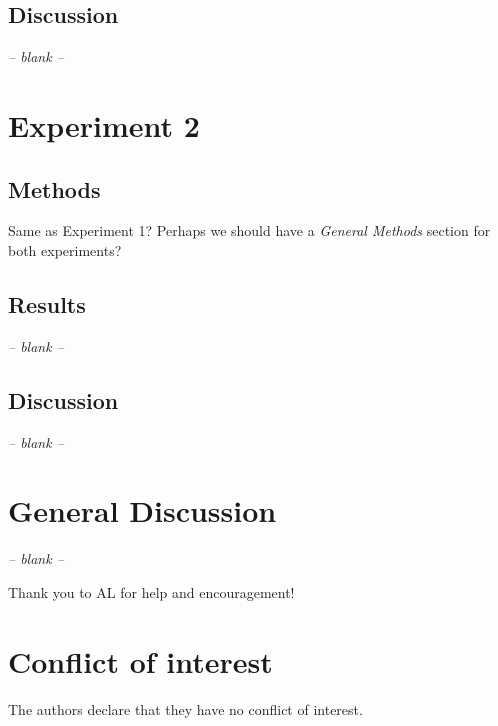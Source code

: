 \documentclass[smallextended]{svjour3}       %
\begin{document}
\subsection{Discussion}
\begin{center}
\textit{-- blank --}
\end{center}

\section{Experiment 2}

\subsection{Methods}

Same as Experiment 1? Perhaps we should have a \textit{General Methods} section for both experiments?

\subsection{Results}
\begin{center}
\textit{-- blank --}
\end{center}

\subsection{Discussion}
\begin{center}
\textit{-- blank --}
\end{center}

\section{General Discussion}
\begin{center}
\textit{-- blank --}
\end{center}

\begin{acknowledgements}
Thank you to AL for help and encouragement! 
\end{acknowledgements}

%
\section*{Conflict of interest}
The authors declare that they have no conflict of interest.
\end{document}
